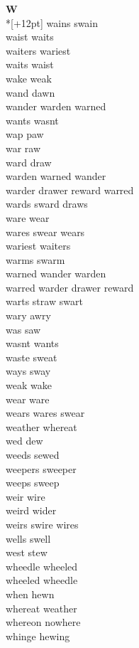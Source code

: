 \vspace{14pt}
\noindent\textbf{\Large W}\\*[+12pt]
wains swain\\
waist waits\\
waiters wariest\\
waits waist\\
wake weak\\
wand dawn\\
wander warden warned\\
wants wasnt\\
wap paw\\
war raw\\
ward draw\\
warden warned wander\\
warder drawer reward warred\\
wards sward draws\\
ware wear\\
wares swear wears\\
wariest waiters\\
warms swarm\\
warned wander warden\\
warred warder drawer reward\\
warts straw swart\\
wary awry\\
was saw\\
wasnt wants\\
waste sweat\\
ways sway\\
weak wake\\
wear ware\\
wears wares swear\\
weather whereat\\
wed dew\\
weeds sewed\\
weepers sweeper\\
weeps sweep\\
weir wire\\
weird wider\\
weirs swire wires\\
wells swell\\
west stew\\
wheedle wheeled\\
wheeled wheedle\\
when hewn\\
whereat weather\\
whereon nowhere\\
whinge hewing\\
